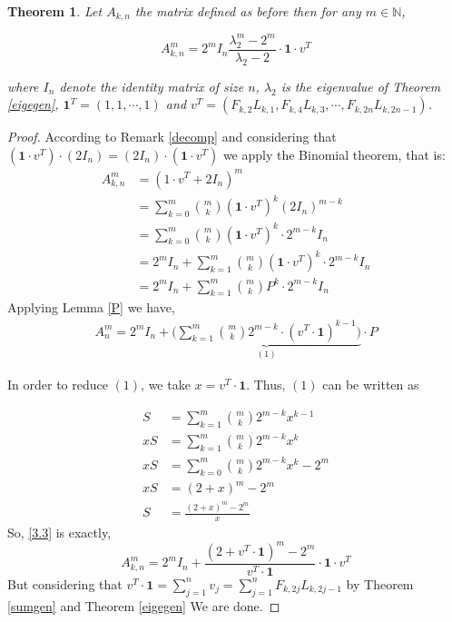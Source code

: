 \documentclass[11pt]{birkjour}
\newtheorem{thm}{Theorem}[section]
\theoremstyle{definition}
\theoremstyle{remark}
\numberwithin{equation}{section}
\begin{document}
\begin{thm}
Let $A_{k,n}$ the matrix defined as before then for any $m\in \mathbb{N}$, 

\[A_{k,n}^{m}=2^{m}I_{n}\frac{\lambda_{2}^{m}-2^{m}}{\lambda_{2}-2}\cdot \mathbf{1}\cdot v^{T}\]

\noindent where $I_n$ denote the identity matrix of size $n$, $\lambda_{2}$ is the eigenvalue of Theorem \ref{eigegen}, $\mathbf{1}^{T}=(1,1,\cdots,1)$ and $v^{T}=(F_{k,2}L_{k,1},F_{k,4}L_{k,3},\cdots,F_{k,2n}L_{k,2n-1})$. 
\end{thm}

\begin{proof}
According to Remark \ref{decomp}  and considering that $(\mathbf{1}\cdot v^{T})\cdot(2I_n)=(2I_n)\cdot (\mathbf{1}\cdot v^{T})$ we apply the Binomial theorem, that is: 
\begin{align*}
A_{k,n}^{m}&= (1\cdot v^{T}+2I_n)^m\\
         &=\displaystyle \sum_{k=0}^{m}\binom{m}{k}(\mathbf{1}\cdot v^{T})^{k}(2I_{n})^{m-k}\\
         &=\displaystyle \sum_{k=0}^{m}\binom{m}{k}(\mathbf{1}\cdot v^{T})^{k}\cdot 2^{m-k}I_{n}\\
         &=2^{m}I_{n}+\displaystyle \sum_{k=1}^{m}\binom{m}{k}(\mathbf{1}\cdot v^{T})^k\cdot 2^{m-k}I_{n}\\
           &=2^{m}I_{n}+\displaystyle \sum_{k=1}^{m}\binom{m}{k}P^k\cdot 2^{m-k}I_{n}        
\end{align*}
Applying Lemma \ref{P} we have, 
\begin{align}\label{3.3}
    A_{n}^{m}=2^mI_{n}+\underbrace{\Big( \displaystyle \sum_{k=1}^{m}\binom{m}{k}2^{m-k}\cdot(v^{T}\cdot \mathbf{1})^{k-1}\Big)}_{(1)}\cdot P
\end{align}

\noindent In order to reduce $(1)$, we take $x=v^{T}\cdot \mathbf{1}$. Thus, $(1)$ can be written as 

\begin{align*}
S&=\displaystyle \sum_{k=1}^{m} \binom{m}{k}2^{m-k}x^{k-1}\\
xS&=\displaystyle \sum_{k=1}^{m} \binom{m}{k}2^{m-k}x^{k}\\
xS&=\displaystyle \sum_{k=0}^{m} \binom{m}{k}2^{m-k}x^{k}-2^{m}\\
xS&=(2+x)^{m}-2^{m} \\
S&=\frac{(2+x)^{m}-2^{m}}{x}
\end{align*}
\noindent  So, \ref{3.3} is exactly, 
\[A_{k,n}^{m}=2^{m}I_{n}+\frac{(2+v^{T}\cdot \mathbf{1})^m-2^{m}}{v^{T}\cdot \mathbf{1}}\cdot \mathbf{1}\cdot v^{T}\]
\noindent But considering  that $v^{T}\cdot \mathbf{1}=\displaystyle \sum_{j=1}^{n}v_j=\sum_{j=1}^{n}F_{k,2j}L_{k,2j-1}$ by Theorem \ref{sumgen} and Theorem \ref{eigegen} We are done.
\end{proof}
\end{document}

